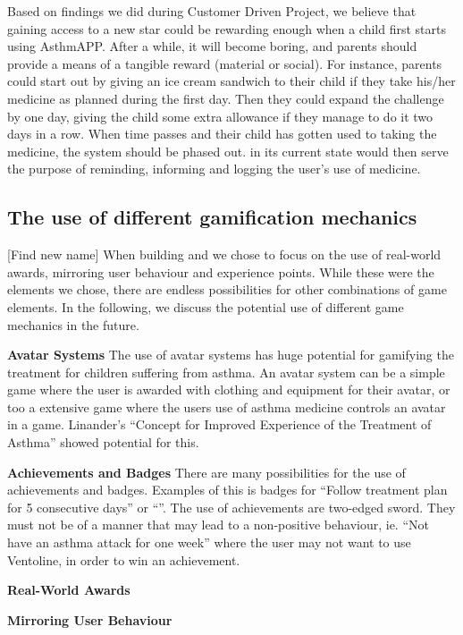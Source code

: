 Based on findings we did during Customer Driven Project\cite{CustomerDriven}, we believe that gaining access to a new star could be rewarding enough when a child first starts using AsthmAPP. After a while, it will become boring, and parents should provide a means of a tangible reward (material or social). For instance, parents could start out by giving an ice cream sandwich to their child if they take his/her medicine as planned during the first day. Then they could expand the challenge by one day, giving the child some extra allowance if they manage to do it two days in a row. When time passes and their child has gotten used to taking the medicine, the system should be phased out. \app{} in its current state would then serve the purpose of reminding, informing and logging the user's use of medicine.

\subsection{The use of different gamification mechanics} [Find new name]
\label{sec:gamificationinthefuture}
When building \app{} and \ab{} we chose to focus on the use of real-world awards, mirroring user behaviour and experience points. While these were the elements we chose, there are endless possibilities for other combinations of game elements. In the following, we discuss the potential use of different game mechanics in the future.

\textbf{Avatar Systems}
The use of avatar systems has huge potential for gamifying the treatment for children suffering from asthma. An avatar system can be a simple game where the user is awarded with clothing and equipment for their avatar, or too a extensive game where the users use of asthma medicine controls an avatar in a game. Linander's ``Concept for Improved Experience of the Treatment of Asthma''\cite{linander2013utvikling} showed potential for this.

\textbf{Achievements and Badges}
There are many possibilities for the use of achievements and badges. Examples of this is badges for ``Follow treatment plan for 5 consecutive days'' or ``''. The use of achievements are two-edged sword. They must not be of a manner that may lead to a non-positive behaviour, ie. ``Not have an asthma attack for one week'' where the user may not want to use Ventoline, in order to win an achievement. 

\textbf{Real-World Awards}

\textbf{Mirroring User Behaviour}

